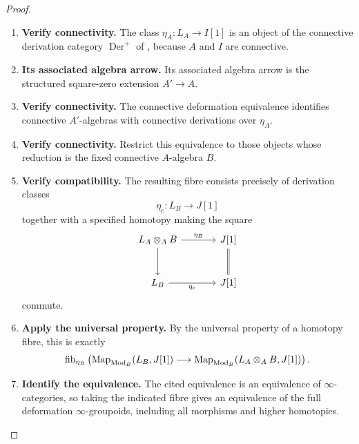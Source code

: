 \begin{proof}
\leavevmode
\begin{enumerate}[label=\textup{(\arabic*)}]
    \item \textbf{Verify connectivity.}
    The class \(\eta_A:L_A\to I[1]\) is an object of the connective derivation category \(\operatorname{Der}^+\) of
    \cite{LurieDAGIV}, because \(A\) and \(I\) are connective.

    \item \textbf{Its associated algebra arrow.}
    Its associated algebra arrow is the structured square-zero extension \(A'\to A\).

    \item \textbf{Verify connectivity.}
    The connective deformation equivalence \cite[Proposition~3.22 and Remark~3.23]{LurieDAGIV}
    identifies connective \(A'\)-algebras with connective derivations over \(\eta_A\).

    \item \textbf{Verify connectivity.}
    Restrict this equivalence to those objects whose reduction is the fixed connective
    \(A\)-algebra \(B\).

    \item \textbf{Verify compatibility.}
    The resulting fibre consists precisely of derivation classes
    \[
        \eta_e:L_B\longrightarrow J[1]
    \]
    together with a specified homotopy making the square
    \[
    \begin{tikzcd}[column sep=large,row sep=large]
        L_A\otimes_AB \arrow[r,"\eta_B"] \arrow[d]
            & J[1] \arrow[d,equal]
        \\
        L_B \arrow[r,"\eta_e"']
            & J[1]
    \end{tikzcd}
    \]
    commute.

    \item \textbf{Apply the universal property.}
    By the universal property of a homotopy fibre, this is exactly
    \[
    \operatorname{fib}_{\eta_B}
    \left(
        \operatorname{Map}_{\operatorname{Mod}_B}(L_B,J[1])
        \longrightarrow
        \operatorname{Map}_{\operatorname{Mod}_B}(L_A\otimes_AB,J[1])
    \right).
    \]

    \item \textbf{Identify the equivalence.}
    The cited equivalence is an equivalence of \(\infty\)-categories, so taking the indicated
    fibre gives an equivalence of the full deformation \(\infty\)-groupoids, including all
    morphisms and higher homotopies.
\end{enumerate}
\end{proof}

